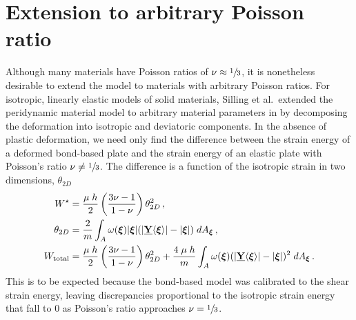 \section{Extension to arbitrary Poisson ratio}
\label{sec:arbitrary}
Although many materials have Poisson ratios of \(\nu\approx \sfrac{1}{3}\), it is nonetheless desirable to extend the model to materials with arbitrary Poisson ratios.  For isotropic, linearly elastic models of solid materials, Silling et al.\ extended the peridynamic material model to arbitrary material parameters in \cite{silling2007peridynamic} by decomposing the deformation into isotropic and deviatoric components.  In the absence of plastic deformation, we need only find the difference between the strain energy of a deformed bond-based plate and the strain energy of an elastic plate with Poisson's ratio \(\nu \neq \sfrac{1}{3}\).  The difference is a function of the isotropic strain in two dimensions, \(\theta_{2D}\)
%
\begin{align}
    W^\star &= \frac{\mu\;h}{2}\left(\frac{3\nu-1}{1-\nu}\right)\theta_{2D}^2 \, ,\notag \\
    \theta_{2D} &= \frac{2}{m}\int_A \omega(\boldsymbol{\xi})|\boldsymbol{\xi}|(|\vstate{Y}{}{\boldsymbol{\xi}}|-|\boldsymbol{\xi}|)\;dA_{\boldsymbol{\xi}}\, , \notag \\
    W_\text{total} &= \frac{\mu\;h}{2}\left(\frac{3\nu-1}{1-\nu}\right)\theta_{2D}^2 + \frac{4\;\mu\;h}{m}\int_A \omega(\boldsymbol{\xi})(|\vstate{Y}{}{\boldsymbol{\xi}}|-|\boldsymbol{\xi}|)^2\;dA_{\boldsymbol{\xi}}\, .\notag
\end{align}
%
This is to be expected because the bond-based model was calibrated to the shear strain energy, leaving discrepancies proportional to the isotropic strain energy that fall to 0 as Poisson's ratio approaches \(\nu = \sfrac{1}{3}\).

